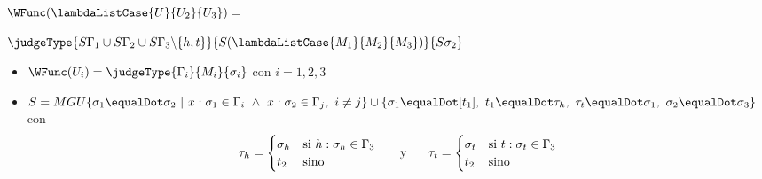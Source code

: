$\WFunc(\lambdaListCase{U}{U_2}{U_3}) =$

\quad$\judgeType{S\Gamma_1\cup S\Gamma_2\cup S\Gamma_3\backslash\{h,t\}}{S(\lambdaListCase{M_1}{M_2}{M_3})}{S\sigma_2}$

\begin{centrado}
	\begin{itemize}
		\item $\WFunc(U_i) = \judgeType{\Gamma_i}{M_i}{\sigma_i}$ con $i = 1,2,3$
		\item $S = MGU\{\sigma_1\equalDot \sigma_2~|~x:\sigma_1\in\Gamma_i~\land~x:\sigma_2\in\Gamma_j,~i\neq j\}\cup\{\sigma_1\equalDot [t_1],~t_1\equalDot \tau_h,~\tau_t\equalDot \sigma_1,~\sigma_2\equalDot\sigma_3\} $ con 
		\[ \tau_h = \begin{cases} 
		\sigma_h & \text{si } h:\sigma_h\in\Gamma_3 \\
		t_2 & \text{sino} \\
		\end{cases} \hspace*{5mm}\text{ y }\hspace*{5mm}
		\tau_t = \begin{cases} 
		\sigma_t & \text{si } t:\sigma_t\in\Gamma_3 \\
		t_2 & \text{sino} \\
		\end{cases}
		\]
	\end{itemize}
\end{centrado}